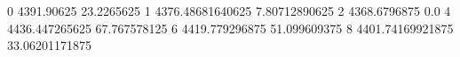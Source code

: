 0 4391.90625 23.2265625
1 4376.48681640625 7.80712890625
2 4368.6796875 0.0
4 4436.447265625 67.767578125
6 4419.779296875 51.099609375
8 4401.74169921875 33.06201171875
